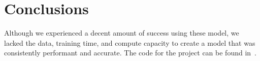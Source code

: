 \section{Conclusions}

Although we experienced a decent amount of success using these model, we lacked the data, training time, and compute capacity to create a model that was consistently performant and accurate.
The code for the project can be found in~\cite{FruitFly}.

